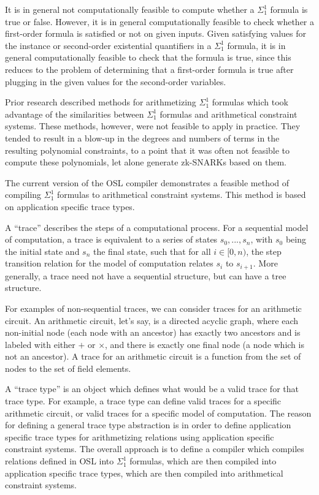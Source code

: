 \documentclass[11pt]{article}
\begin{document}
It is in general not computationally feasible to compute whether a $\Sigma^1_1$ formula is true or false. However, it is in general computationally feasible to check whether a first-order formula is satisfied or not on given inputs. Given satisfying values for the instance or second-order existential quantifiers in a $\Sigma^1_1$ formula, it is in general computationally feasible to check that the formula is true, since this reduces to the problem of determining that a first-order formula is true after plugging in the given values for the second-order variables.

Prior research \cite{sigma11,sigma11-poly-bounds} described methods for arithmetizing $\Sigma^1_1$ formulas which took advantage of the similarities between $\Sigma^1_1$ formulas and arithmetical constraint systems. These methods, however, were not feasible to apply in practice. They tended to result in a blow-up in the degrees and numbers of terms in the resulting polynomial constraints, to a point that it was often not feasible to compute these polynomials, let alone generate zk-SNARKs based on them.

The current version of the OSL compiler \cite{osl-github} demonstrates a feasible method of compiling $\Sigma^1_1$ formulas to arithmetical constraint systems. This method is based on application specific trace types.

A ``trace'' describes the steps of a computational process. For a sequential model of computation, a trace is equivalent to a series of states $s_0, ..., s_n$, with $s_0$ being the initial state and $s_n$ the final state, such that for all $i \in [0,n)$, the step transition relation for the model of computation relates $s_i$ to $s_{i+1}$. More generally, a trace need not have a sequential structure, but can have a tree structure.

For examples of non-sequential traces, we can consider traces for an arithmetic circuit. An arithmetic circuit, let's say, is a directed acyclic graph, where each non-initial node (each node with an ancestor) has exactly two ancestors and is labeled with either $+$ or $\times$, and there is exactly one final node (a node which is not an ancestor). A trace for an arithmetic circuit is a function from the set of nodes to the set of field elements.

A ``trace type'' is an object which defines what would be a valid trace for that trace type. For example, a trace type can define valid traces for a specific arithmetic circuit, or valid traces for a specific model of computation. The reason for defining a general trace type abstraction is in order to define application specific trace types for arithmetizing relations using application specific constraint systems. The overall approach is to define a compiler which compiles relations defined in OSL into $\Sigma^1_1$ formulas, which are then compiled into application specific trace types, which are then compiled into arithmetical constraint systems.
\end{document}

